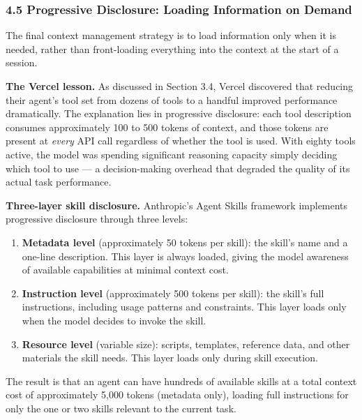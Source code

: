 \documentclass[11pt, a4paper]{article}
\providecommand{\tightlist}{%
  \setlength{\itemsep}{0pt}\setlength{\parskip}{0pt}}
\begin{document}
\hypertarget{progressive-disclosure-loading-information-on-demand}{%
\subsubsection{4.5 Progressive Disclosure: Loading Information on
Demand}\label{progressive-disclosure-loading-information-on-demand}}

The final context management strategy is to load information only when
it is needed, rather than front-loading everything into the context at
the start of a session.

\textbf{The Vercel lesson.} As discussed in Section 3.4, Vercel
discovered that reducing their agent's tool set from dozens of tools to
a handful improved performance dramatically. The explanation lies in
progressive disclosure: each tool description consumes approximately 100
to 500 tokens of context, and those tokens are present at \emph{every}
API call regardless of whether the tool is used. With eighty tools
active, the model was spending significant reasoning capacity simply
deciding which tool to use --- a decision-making overhead that degraded
the quality of its actual task performance.

\textbf{Three-layer skill disclosure.} Anthropic's Agent Skills
framework implements progressive disclosure through three levels:

\begin{enumerate}
\def\labelenumi{\arabic{enumi}.}
\tightlist
\item
  \textbf{Metadata level} (approximately 50 tokens per skill): the
  skill's name and a one-line description. This layer is always loaded,
  giving the model awareness of available capabilities at minimal
  context cost.
\item
  \textbf{Instruction level} (approximately 500 tokens per skill): the
  skill's full instructions, including usage patterns and constraints.
  This layer loads only when the model decides to invoke the skill.
\item
  \textbf{Resource level} (variable size): scripts, templates, reference
  data, and other materials the skill needs. This layer loads only
  during skill execution.
\end{enumerate}

The result is that an agent can have hundreds of available skills at a
total context cost of approximately 5,000 tokens (metadata only),
loading full instructions for only the one or two skills relevant to the
current task.
\end{document}
